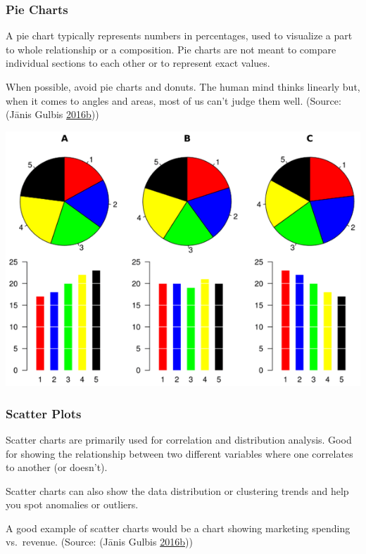 \documentclass[]{book}
\begin{document}
\hypertarget{pie-charts}{%
\subsubsection{Pie Charts}\label{pie-charts}}

A pie chart typically represents numbers in percentages, used to visualize a part to whole relationship or a composition. Pie charts are not meant to compare individual sections to each other or to represent exact values.

When possible, avoid pie charts and donuts. The human mind thinks linearly but, when it comes to angles and areas, most of us can't judge them well.
(Source: (Jānis Gulbis \protect\hyperlink{ref-pick_chart}{2016}\protect\hyperlink{ref-pick_chart}{b}))

\includegraphics{images/pie-chart-diag.png}

\hypertarget{scatter-plots}{%
\subsubsection{Scatter Plots}\label{scatter-plots}}

Scatter charts are primarily used for correlation and distribution analysis. Good for showing the relationship between two different variables where one correlates to another (or doesn't).

Scatter charts can also show the data distribution or clustering trends and help you spot anomalies or outliers.

A good example of scatter charts would be a chart showing marketing spending vs.~revenue.
(Source: (Jānis Gulbis \protect\hyperlink{ref-pick_chart}{2016}\protect\hyperlink{ref-pick_chart}{b}))
\end{document}
